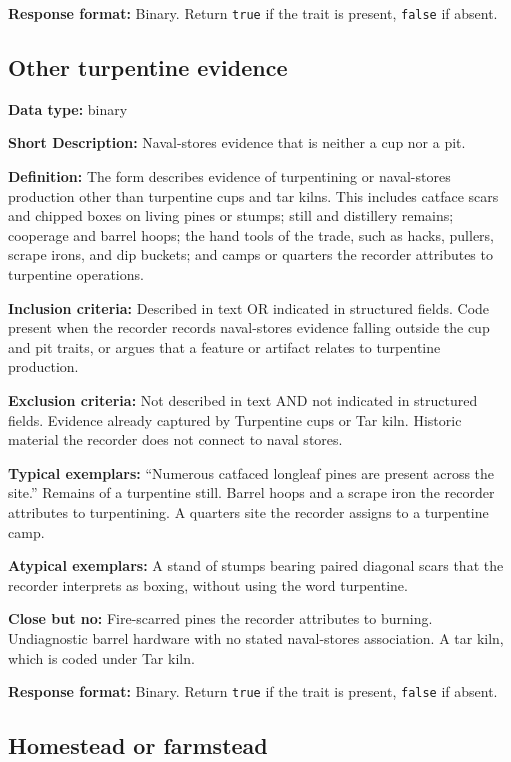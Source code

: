 \documentclass[
]{article}
\begin{document}
\textbf{Response format:} Binary. Return \texttt{true} if the trait is
present, \texttt{false} if absent.

\subsection{Other turpentine evidence}\label{other-turpentine-evidence}

\textbf{Data type:} binary

\textbf{Short Description:} Naval-stores evidence that is neither a cup
nor a pit.

\textbf{Definition:} The form describes evidence of turpentining or
naval-stores production other than turpentine cups and tar kilns. This
includes catface scars and chipped boxes on living pines or stumps;
still and distillery remains; cooperage and barrel hoops; the hand tools
of the trade, such as hacks, pullers, scrape irons, and dip buckets; and
camps or quarters the recorder attributes to turpentine operations.

\textbf{Inclusion criteria:} Described in text OR indicated in
structured fields. Code present when the recorder records naval-stores
evidence falling outside the cup and pit traits, or argues that a
feature or artifact relates to turpentine production.

\textbf{Exclusion criteria:} Not described in text AND not indicated in
structured fields. Evidence already captured by Turpentine cups or Tar
kiln. Historic material the recorder does not connect to naval stores.

\textbf{Typical exemplars:} ``Numerous catfaced longleaf pines are
present across the site.'' Remains of a turpentine still. Barrel hoops
and a scrape iron the recorder attributes to turpentining. A quarters
site the recorder assigns to a turpentine camp.

\textbf{Atypical exemplars:} A stand of stumps bearing paired diagonal
scars that the recorder interprets as boxing, without using the word
turpentine.

\textbf{Close but no:} Fire-scarred pines the recorder attributes to
burning. Undiagnostic barrel hardware with no stated naval-stores
association. A tar kiln, which is coded under Tar kiln.

\textbf{Response format:} Binary. Return \texttt{true} if the trait is
present, \texttt{false} if absent.

\subsection{Homestead or farmstead}\label{homestead-or-farmstead}
\end{document}
